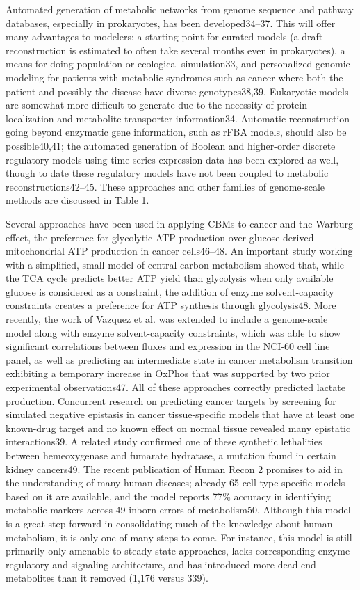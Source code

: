 \documentclass[phd,tocprelim]{cornell}
\theoremstyle{break}
\begin{document}
Automated generation of metabolic networks from genome sequence and
pathway databases, especially in prokaryotes, has been developed34–37.
This will offer many advantages to modelers: a starting point for
curated models (a draft reconstruction is estimated to often take
several months even in prokaryotes), a means for doing population or
ecological simulation33, and personalized genomic modeling for
patients with metabolic syndromes such as cancer where both the
patient and possibly the disease have diverse genotypes38,39.
Eukaryotic models are somewhat more difficult to generate due to the
necessity of protein localization and metabolite transporter
information34. Automatic reconstruction going beyond enzymatic gene
information, such as rFBA models, should also be possible40,41; the
automated generation of Boolean and higher-order discrete regulatory
models using time-series expression data has been explored as well,
though to date these regulatory models have not been coupled to
metabolic reconstructions42–45. These approaches and other families of
genome-scale methods are discussed in Table 1.

Several approaches have been used in applying CBMs to cancer and the
Warburg effect, the preference for glycolytic ATP production over
glucose-derived mitochondrial ATP production in cancer cells46–48. An
important study working with a simplified, small model of
central-carbon metabolism showed that, while the TCA cycle predicts
better ATP yield than glycolysis when only available glucose is
considered as a constraint, the addition of enzyme solvent-capacity
constraints creates a preference for ATP synthesis through
glycolysis48. More recently, the work of Vazquez et al. was extended
to include a genome-scale model along with enzyme solvent-capacity
constraints, which was able to show significant correlations between
fluxes and expression in the NCI-60 cell line panel, as well as
predicting an intermediate state in cancer metabolism transition
exhibiting a temporary increase in OxPhos that was supported by two
prior experimental observations47. All of these approaches correctly
predicted lactate production. Concurrent research on predicting cancer
targets by screening for simulated negative epistasis in cancer
tissue-specific models that have at least one known-drug target and no
known effect on normal tissue revealed many epistatic
interactions39. A related study confirmed one of these synthetic
lethalities between hemeoxygenase and fumarate hydratase, a mutation
found in certain kidney cancers49. The recent publication of Human
Recon 2 promises to aid in the understanding of many human diseases;
already 65 cell-type specific models based on it are available, and
the model reports 77\% accuracy in identifying metabolic markers
across 49 inborn errors of metabolism50. Although this model is a
great step forward in consolidating much of the knowledge about human
metabolism, it is only one of many steps to come. For instance, this
model is still primarily only amenable to steady-state approaches,
lacks corresponding enzyme-regulatory and signaling architecture, and
has introduced more dead-end metabolites than it removed (1,176 versus
339). 
\end{document}
